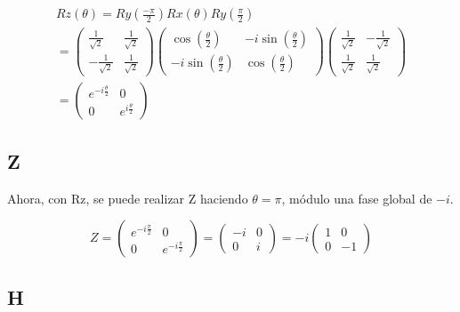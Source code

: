 \begin{multline}
    Rz(\theta) = Ry(\frac{-\pi}{2}) Rx(\theta) Ry(\frac{\pi}{2}) \\ =
    \begin{pmatrix}
        \frac{1}{\sqrt{2}} & \frac{1}{\sqrt{2}} \\
        -\frac{1}{\sqrt{2}} & \frac{1}{\sqrt{2}}
    \end{pmatrix}
    \begin{pmatrix}
        \cos(\frac{\theta}{2}) & -i \sin(\frac{\theta}{2}) \\
        -i \sin(\frac{\theta}{2}) & \cos(\frac{\theta}{2})
    \end{pmatrix}
    \begin{pmatrix}
        \frac{1}{\sqrt{2}} & -\frac{1}{\sqrt{2}} \\
        \frac{1}{\sqrt{2}} & \frac{1}{\sqrt{2}}
    \end{pmatrix} \\ =
    \begin{pmatrix}
        e^{- i \frac{\theta}{2}} & 0 \\
        0 & e^{i \frac{\theta}{2}}
    \end{pmatrix}
\end{multline}

\subsection{Z}

Ahora, con Rz, se puede realizar Z haciendo $\theta = \pi$, módulo una fase global de $-i$.

\begin{equation}
    Z = 
    \begin{pmatrix}
        e^{- i \frac{\pi}{2}} & 0 \\
        0 & e^{- i \frac{\pi}{2}}
    \end{pmatrix} = 
    \begin{pmatrix}
        -i & 0 \\
        0 & i
    \end{pmatrix} = 
    -i \begin{pmatrix}
        1 & 0 \\
        0 & -1
    \end{pmatrix}
\end{equation}


\subsection{H}

